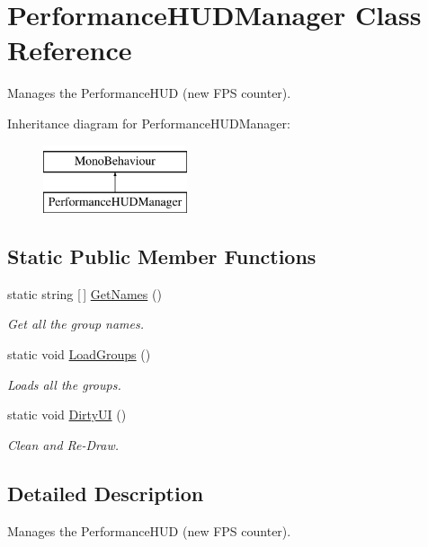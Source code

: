 \hypertarget{class_performance_h_u_d_manager}{}\section{Performance\+H\+U\+D\+Manager Class Reference}
\label{class_performance_h_u_d_manager}


Manages the Performance\+H\+UD (new F\+PS counter).  


Inheritance diagram for Performance\+H\+U\+D\+Manager\+:\begin{figure}[H]
\begin{center}
\leavevmode
\includegraphics[height=2.000000cm]{class_performance_h_u_d_manager}
\end{center}
\end{figure}
\subsection*{Static Public Member Functions}
\begin{DoxyCompactItemize}
\item 
static string \mbox{[}$\,$\mbox{]} \hyperlink{class_performance_h_u_d_manager_ae70ce14a75f1578cea6e15901fc2b305}{Get\+Names} ()
\begin{DoxyCompactList}\small\item\em Get all the group names. \end{DoxyCompactList}\item 
static void \hyperlink{class_performance_h_u_d_manager_aecf644c11bb2555b50d4c718cbe240d7}{Load\+Groups} ()
\begin{DoxyCompactList}\small\item\em Loads all the groups. \end{DoxyCompactList}\item 
static void \hyperlink{class_performance_h_u_d_manager_a54f1660556013d694c89ce9c84453614}{Dirty\+UI} ()
\begin{DoxyCompactList}\small\item\em Clean and Re-\/\+Draw. \end{DoxyCompactList}\end{DoxyCompactItemize}


\subsection{Detailed Description}
Manages the Performance\+H\+UD (new F\+PS counter). 



